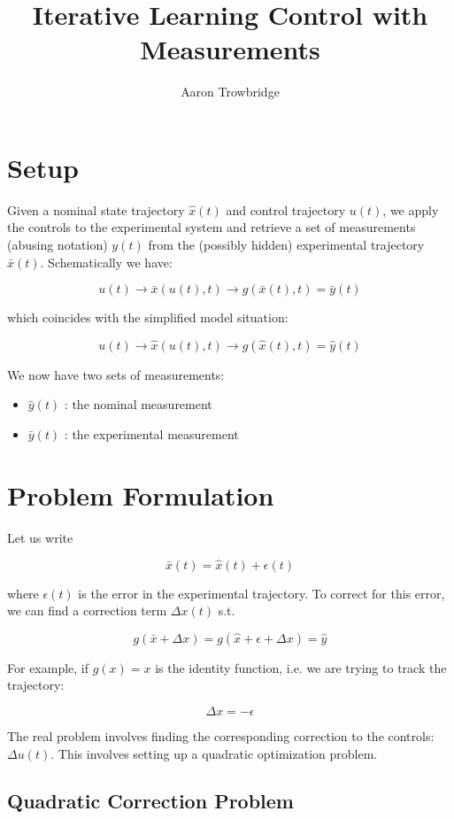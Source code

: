 \documentclass{article}
\title{Iterative Learning Control with Measurements}
\author{Aaron Trowbridge}
\date{}
\begin{document}
\maketitle

\section*{Setup}

Given a nominal state trajectory $\hat{x}(t)$ and control trajectory $u(t)$, we apply the controls to the experimental system and retrieve a set of measurements (abusing notation) $y(t)$ from the (possibly hidden) experimental trajectory $\bar x (t)$. Schematically we have:

$$
u(t) \longrightarrow \bar x (u(t), t) \longrightarrow g(\bar x(t), t) = \bar y(t)
$$

 
which coincides with the simplified model situation:

$$
u(t) \longrightarrow \hat x (u(t), t) \longrightarrow g(\hat x(t), t) = \hat y(t)
$$


We now have two sets of measurements: 

\begin{itemize}
  \item $\hat y(t)$ : the nominal measurement
  \item $\bar y(t)$ : the experimental measurement
\end{itemize}

\section*{Problem Formulation}

Let us write

$$
\bar x (t) = \hat x (t) + \epsilon(t)
$$


where $\epsilon(t)$ is the error in the experimental trajectory.  To correct for this error, we can find a correction term $\Delta x(t)$ s.t.

$$
g(\bar x + \Delta x) = g(\hat x + \epsilon + \Delta x ) = \hat y
$$

For example, if $g(x) = x$ is the identity function, i.e. we are trying to track the trajectory:

$$
\Delta x = - \epsilon
$$

The real problem involves finding the corresponding correction to the controls: $\Delta u(t)$. This involves setting up a quadratic optimization problem.

\newpage
\subsection*{Quadratic Correction Problem}
\end{document}
